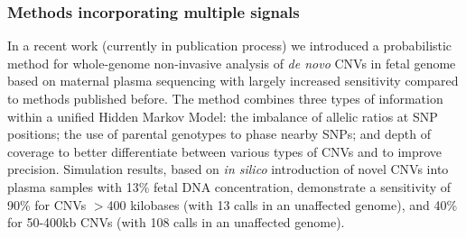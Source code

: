 \subsubsection{Methods incorporating multiple signals}
In a recent work \citep{rampasek2014fcnv} (currently in publication process) we introduced a probabilistic method for whole-genome non-invasive analysis of \textit{de novo} CNVs in fetal genome based on maternal plasma sequencing with largely increased sensitivity compared to methods published before. The method combines three types of information within a unified Hidden Markov Model: the imbalance of allelic ratios at SNP positions; the use of parental genotypes to phase nearby SNPs; and depth of coverage to better differentiate between various types of CNVs and to improve precision. Simulation results, based on \emph{in silico} introduction of novel CNVs into plasma samples with 13\% fetal DNA concentration, demonstrate a sensitivity of 90\% for CNVs $>$400 kilobases (with 13 calls in an unaffected genome), and 40\% for 50-400kb CNVs (with 108 calls in an unaffected genome).